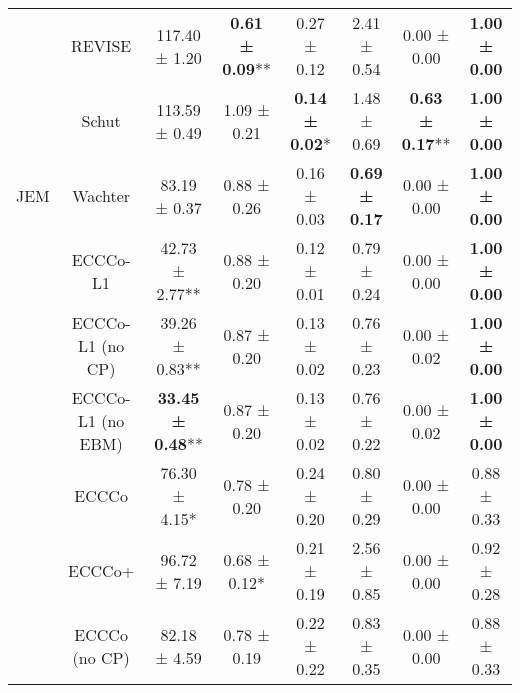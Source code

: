 \begin{table}
{\begin{tabular}[t]{cccccccc}
 & REVISE & 117.40 ± 1.20\hphantom{*}\hphantom{*} & \textbf{0.61 ± 0.09}** & 0.27 ± 0.12\hphantom{*}\hphantom{*} & 2.41 ± 0.54\hphantom{*}\hphantom{*} & 0.00 ± 0.00\hphantom{*}\hphantom{*} & \textbf{1.00 ± 0.00}\hphantom{*}\hphantom{*}\\

 & Schut & 113.59 ± 0.49\hphantom{*}\hphantom{*} & 1.09 ± 0.21\hphantom{*}\hphantom{*} & \textbf{0.14 ± 0.02}*\hphantom{*} & 1.48 ± 0.69\hphantom{*}\hphantom{*} & \textbf{0.63 ± 0.17}** & \textbf{1.00 ± 0.00}\hphantom{*}\hphantom{*}\\

\multirow[t]{-10}{*}{\centering\arraybackslash JEM} & Wachter & 83.19 ± 0.37\hphantom{*}\hphantom{*} & 0.88 ± 0.26\hphantom{*}\hphantom{*} & 0.16 ± 0.03\hphantom{*}\hphantom{*} & \textbf{0.69 ± 0.17}\hphantom{*}\hphantom{*} & 0.00 ± 0.00\hphantom{*}\hphantom{*} & \textbf{1.00 ± 0.00}\hphantom{*}\hphantom{*}\\
\cmidrule{1-8}
 & ECCCo-L1 & 42.73 ± 2.77** & 0.88 ± 0.20\hphantom{*}\hphantom{*} & 0.12 ± 0.01\hphantom{*}\hphantom{*} & 0.79 ± 0.24\hphantom{*}\hphantom{*} & 0.00 ± 0.00\hphantom{*}\hphantom{*} & \textbf{1.00 ± 0.00}\hphantom{*}\hphantom{*}\\

 & ECCCo-L1 (no CP) & 39.26 ± 0.83** & 0.87 ± 0.20\hphantom{*}\hphantom{*} & 0.13 ± 0.02\hphantom{*}\hphantom{*} & 0.76 ± 0.23\hphantom{*}\hphantom{*} & 0.00 ± 0.02\hphantom{*}\hphantom{*} & \textbf{1.00 ± 0.00}\hphantom{*}\hphantom{*}\\

 & ECCCo-L1 (no EBM) & \textbf{33.45 ± 0.48}** & 0.87 ± 0.20\hphantom{*}\hphantom{*} & 0.13 ± 0.02\hphantom{*}\hphantom{*} & 0.76 ± 0.22\hphantom{*}\hphantom{*} & 0.00 ± 0.02\hphantom{*}\hphantom{*} & \textbf{1.00 ± 0.00}\hphantom{*}\hphantom{*}\\

 & ECCCo & 76.30 ± 4.15*\hphantom{*} & 0.78 ± 0.20\hphantom{*}\hphantom{*} & 0.24 ± 0.20\hphantom{*}\hphantom{*} & 0.80 ± 0.29\hphantom{*}\hphantom{*} & 0.00 ± 0.00\hphantom{*}\hphantom{*} & 0.88 ± 0.33\hphantom{*}\hphantom{*}\\

 & ECCCo+ & 96.72 ± 7.19\hphantom{*}\hphantom{*} & 0.68 ± 0.12*\hphantom{*} & 0.21 ± 0.19\hphantom{*}\hphantom{*} & 2.56 ± 0.85\hphantom{*}\hphantom{*} & 0.00 ± 0.00\hphantom{*}\hphantom{*} & 0.92 ± 0.28\hphantom{*}\hphantom{*}\\

 & ECCCo (no CP) & 82.18 ± 4.59\hphantom{*}\hphantom{*} & 0.78 ± 0.19\hphantom{*}\hphantom{*} & 0.22 ± 0.22\hphantom{*}\hphantom{*} & 0.83 ± 0.35\hphantom{*}\hphantom{*} & 0.00 ± 0.00\hphantom{*}\hphantom{*} & 0.88 ± 0.33\hphantom{*}\hphantom{*}\\


\end{tabular}}
\end{table}
